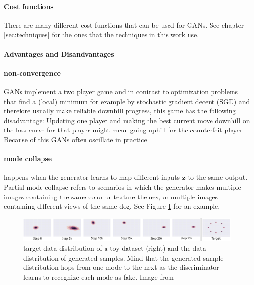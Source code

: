 \paragraph{Cost functions} There are many different cost functions that can be used for GANs. See chapter \ref{sec:techniques} for the ones that the techniques in this work use.


\paragraph{Advantages and Disandvantages}
\paragraph{non-convergence} GANs implement a two player game and in contrast to optimization problems that find a (local) minimum for example by stochastic gradient decent (SGD) and therefore usually make reliable downhill progress, this game has the following disadvantage: Updating one player and making the best current move downhill on the loss curve for that player might mean going uphill for the counterfeit player. Because of this GANs often oscillate in practice.

\paragraph{mode collapse} happens when the generator learns to map different inputs $\mathbf{z}$ to the same output. Partial mode collapse refers to scenarios in which the generator makes multiple images containing the same color or texture themes, or multiple images containing different views of the same dog. See Figure \ref{fig:mode_collapse} for an example.
\begin{figure}
	\centering
	\includegraphics[width=\textwidth]{images/metz_et_al_mode_collapse.png}
	\caption{target data distribution of a toy dataset (right) and the data distribution of generated samples. Mind that the generated sample distribution hops from one mode to the next as the discriminator learns to recognize each mode as fake. Image from \cite{DBLP:journals/corr/MetzPPS16}}
	\label{fig:mode_collapse}
\end{figure}